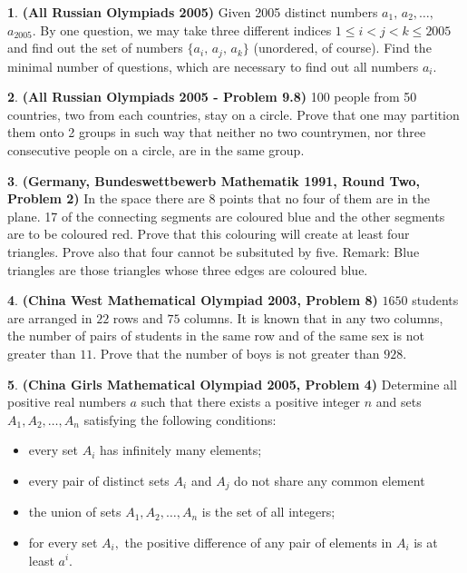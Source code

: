 \documentclass{article}
\theoremstyle{definition}
\newtheorem{p}{}
\begin{document}
\begin{p}{\bf(All Russian Olympiads 2005)}
Given 2005 distinct numbers $a_1,\,a_2,\dots,$ $a_{2005}$. By one question, we may take three different indices $1\le i<j<k\le 2005$ and find out the set of numbers $\{a_i,\,a_j,\,a_k\}$ (unordered, of course).  Find the minimal number of questions, which are necessary to find out all numbers $a_i$.
\end{p}





\begin{p}{\bf(All Russian Olympiads 2005 - Problem 9.8)}
100 people from 50 countries, two from each countries, stay on a circle. Prove that one may partition them onto 2 groups in such way that neither no two countrymen, nor three consecutive people on a circle, are in the same group.
\end{p}




\begin{p}{\bf(Germany, Bundeswettbewerb Mathematik 1991, Round Two, Problem 2)}
In the space there are 8 points that no four of them are in the plane. 17 of the connecting segments are coloured blue and the other segments are to be coloured red. Prove that this colouring will create at least four triangles. Prove also that four cannot be subsituted by five.
\newline
Remark: Blue triangles are those triangles whose three edges are coloured blue.
\end{p}



\begin{p}{\bf (China West Mathematical Olympiad 2003, Problem 8)}
$ 1650$ students are arranged in $ 22$ rows and $ 75$ columns.  It is known that in any two columns, the number of pairs of students in the same row and of the same sex is not greater than $ 11$.  Prove that the number of boys is not greater than $ 928$.
\end{p}





\begin{p}{\bf (China Girls Mathematical Olympiad 2005, Problem 4)}
Determine all positive real numbers $ a$ such that there exists a positive integer $ n$ and sets $ A_1, A_2, \ldots, A_n$ satisfying the following conditions:
\begin{itemize}
\item every set $ A_i$ has infinitely many elements;
\item every pair of distinct sets $ A_i$ and $ A_j$ do not share any common element
\item the union of sets $ A_1, A_2, \ldots, A_n$ is the set of all integers;
\item for every set $ A_i,$ the positive difference of any pair of elements in $ A_i$ is at least $ a^i.$
\end{itemize}
\end{p}
\end{document}
